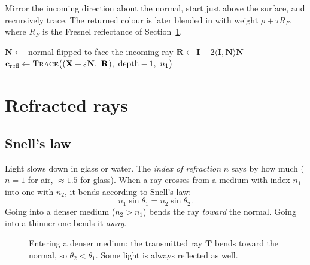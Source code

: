 \documentclass[11pt,a4paper]{article}
\newcommand{\vv}[1]{\mathbf{#1}}
\newcommand{\dotp}[2]{\langle #1, #2\rangle}
\begin{document}
\begin{inshort}
Mirror the incoming direction about the normal, start just above the surface,
and recursively trace. The returned colour is later blended in with weight
$\rho + \tau R_F$, where $R_F$ is the Fresnel reflectance of
Section~\ref{sec:refraction}.
\end{inshort}

\begin{algorithm}[h]
\caption{Reflected ray}
\begin{algorithmic}[1]
\State $\vv N\gets$ normal flipped to face the incoming ray
\State $\vv R\gets \vv I-2\dotp{\vv I}{\vv N}\vv N$
\State $\vv c_{\text{refl}}\gets\textsc{Trace}\big((\vv X+\varepsilon\vv N,\ \vv R),\ \text{depth}-1,\ n_1\big)$
\end{algorithmic}
\end{algorithm}

\section{Refracted rays}\label{sec:refraction}

\subsection{Snell's law}

Light slows down in glass or water. The \emph{index of refraction} $n$ says by
how much ($n=1$ for air, $\approx1.5$ for glass). When a ray crosses from a
medium with index $n_1$ into one with $n_2$, it bends according to Snell's law:
\[
  n_1\sin\theta_1 = n_2\sin\theta_2 .
\]
Going into a denser medium ($n_2>n_1$) bends the ray \emph{toward} the normal.
Going into a thinner one bends it \emph{away}.

\begin{figure}[h]
\centering
{}
\caption{Entering a denser medium: the transmitted ray $\vv T$ bends toward the
normal, so $\theta_2<\theta_1$. Some light is always reflected as well.}
\end{figure}
\end{document}
